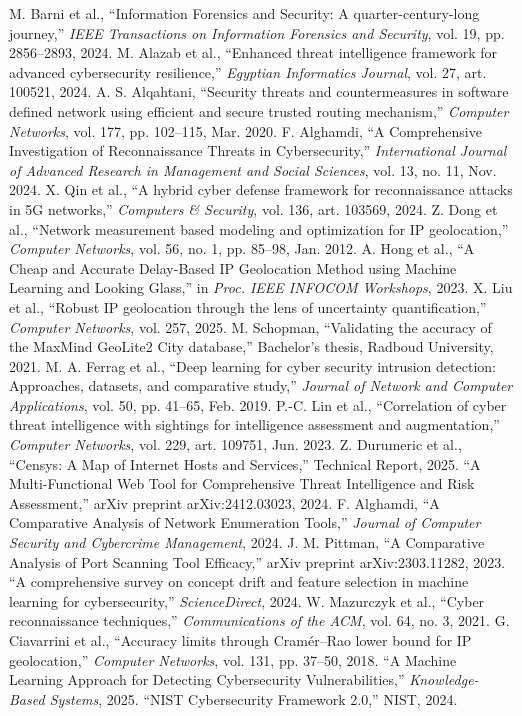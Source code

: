 \begin{thebibliography}{99}

 M. Barni et al., ``Information Forensics and Security: A quarter-century-long journey,'' \textit{IEEE Transactions on Information Forensics and Security}, vol. 19, pp. 2856--2893, 2024.
 M. Alazab et al., ``Enhanced threat intelligence framework for advanced cybersecurity resilience,'' \textit{Egyptian Informatics Journal}, vol. 27, art. 100521, 2024.
 A. S. Alqahtani, ``Security threats and countermeasures in software defined network using efficient and secure trusted routing mechanism,'' \textit{Computer Networks}, vol. 177, pp. 102--115, Mar. 2020.
 F. Alghamdi, ``A Comprehensive Investigation of Reconnaissance Threats in Cybersecurity,'' \textit{International Journal of Advanced Research in Management and Social Sciences}, vol. 13, no. 11, Nov. 2024.
 X. Qin et al., ``A hybrid cyber defense framework for reconnaissance attacks in 5G networks,'' \textit{Computers \& Security}, vol. 136, art. 103569, 2024.
 Z. Dong et al., ``Network measurement based modeling and optimization for IP geolocation,'' \textit{Computer Networks}, vol. 56, no. 1, pp. 85--98, Jan. 2012.
 A. Hong et al., ``A Cheap and Accurate Delay-Based IP Geolocation Method using Machine Learning and Looking Glass,'' in \textit{Proc. IEEE INFOCOM Workshops}, 2023.
 X. Liu et al., ``Robust IP geolocation through the lens of uncertainty quantification,'' \textit{Computer Networks}, vol. 257, 2025.
 M. Schopman, ``Validating the accuracy of the MaxMind GeoLite2 City database,'' Bachelor's thesis, Radboud University, 2021.
 M. A. Ferrag et al., ``Deep learning for cyber security intrusion detection: Approaches, datasets, and comparative study,'' \textit{Journal of Network and Computer Applications}, vol. 50, pp. 41--65, Feb. 2019.
 P.-C. Lin et al., ``Correlation of cyber threat intelligence with sightings for intelligence assessment and augmentation,'' \textit{Computer Networks}, vol. 229, art. 109751, Jun. 2023.
 Z. Durumeric et al., ``Censys: A Map of Internet Hosts and Services,'' Technical Report, 2025.
 ``A Multi-Functional Web Tool for Comprehensive Threat Intelligence and Risk Assessment,'' arXiv preprint arXiv:2412.03023, 2024.
 F. Alghamdi, ``A Comparative Analysis of Network Enumeration Tools,'' \textit{Journal of Computer Security and Cybercrime Management}, 2024.
 J. M. Pittman, ``A Comparative Analysis of Port Scanning Tool Efficacy,'' arXiv preprint arXiv:2303.11282, 2023.
 ``A comprehensive survey on concept drift and feature selection in machine learning for cybersecurity,'' \textit{ScienceDirect}, 2024.
 W. Mazurczyk et al., ``Cyber reconnaissance techniques,'' \textit{Communications of the ACM}, vol. 64, no. 3, 2021.
 G. Ciavarrini et al., ``Accuracy limits through Cram\'er--Rao lower bound for IP geolocation,'' \textit{Computer Networks}, vol. 131, pp. 37--50, 2018.
 ``A Machine Learning Approach for Detecting Cybersecurity Vulnerabilities,'' \textit{Knowledge-Based Systems}, 2025.
 ``NIST Cybersecurity Framework 2.0,'' NIST, 2024.

\end{thebibliography}
